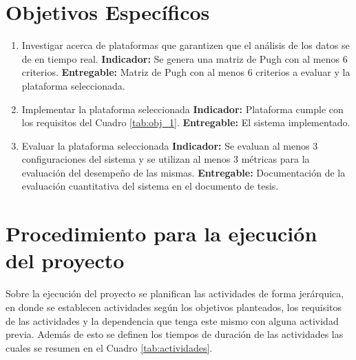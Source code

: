 \documentclass[12pt]{article}
\begin{document}
\section{Objetivos Específicos}

\begin{enumerate}
  \item Investigar acerca de plataformas que garantizen que el análisis de los datos se de en tiempo real. \newline
        \textbf{Indicador:} Se genera una matriz de Pugh con al menos 6 criterios.\newline
        \textbf{Entregable:} Matriz de Pugh con al menos 6 criterios a evaluar y la plataforma seleccionada.
  \item Implementar la plataforma seleccionada \newline
        \textbf{Indicador:} Plataforma cumple con los requisitos del Cuadro \ref{tab:obj_1}.\newline
        \textbf{Entregable:} El sistema implementado.
  \item Evaluar la plataforma seleccionada \newline
        \textbf{Indicador:} Se evaluan al menos 3 configuraciones del sistema y se utilizan al menos 3 métricas para la evaluación del desempeño de las mismas.\newline
        \textbf{Entregable:} Documentación de la evaluación cuantitativa del sistema en el documento de tesis.
\end{enumerate}

\section{Procedimiento para la ejecución del proyecto}

Sobre la ejecución del proyecto se planifican las actividades de forma jerárquica, en donde se establecen actividades según los objetivos planteados, los requisitos de las actividades y la dependencia que tenga este mismo con alguna actividad previa. Además de esto se definen los tiempos de duración de las actividades las cuales se resumen en el Cuadro \ref{tab:actividades}.
\end{document}
